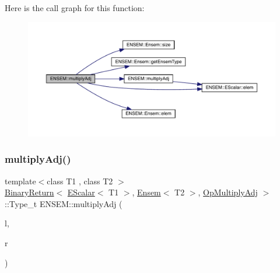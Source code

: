 Here is the call graph for this function\+:\nopagebreak
\begin{figure}[H]
\begin{center}
\leavevmode
\includegraphics[width=350pt]{d1/d9e/group__eensem_ga8ab2ff96201bb49703846d6eb968fd11_cgraph}
\end{center}
\end{figure}
\mbox{\label{group__eensem_ga54febfeb3d62a5f905b336fb99d89805}} 
\subsubsection{\texorpdfstring{multiplyAdj()}{multiplyAdj()}\hspace{0.1cm}{\footnotesize\ttfamily [3/3]}}
{\footnotesize\ttfamily template$<$class T1 , class T2 $>$ \\
\mbox{\hyperlink{structENSEM_1_1BinaryReturn}{Binary\+Return}}$<$ \mbox{\hyperlink{classENSEM_1_1EScalar}{E\+Scalar}}$<$ T1 $>$, \mbox{\hyperlink{classENSEM_1_1Ensem}{Ensem}}$<$ T2 $>$, \mbox{\hyperlink{structENSEM_1_1OpMultiplyAdj}{Op\+Multiply\+Adj}} $>$\+::Type\+\_\+t E\+N\+S\+E\+M\+::multiply\+Adj (\begin{DoxyParamCaption}\item[{const \mbox{\hyperlink{classENSEM_1_1EScalar}{E\+Scalar}}$<$ T1 $>$ \&}]{l,  }\item[{const \mbox{\hyperlink{classENSEM_1_1Ensem}{Ensem}}$<$ T2 $>$ \&}]{r }\end{DoxyParamCaption})\hspace{0.3cm}{\ttfamily [inline]}}

